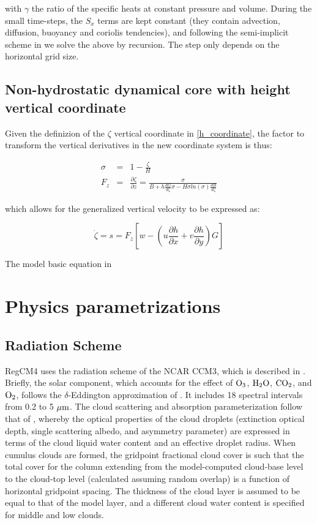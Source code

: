 with $\gamma$ the ratio of the specific heats at constant pressure and volume.
During the small time-steps, the $S_x$ terms are kept constant (they contain
advection, diffusion, buoyancy and coriolis tendencies), and following the
semi-implicit scheme in \cite{Klemp_1978} we solve the above by recursion.
The step only depends on the horizontal grid size.

\subsection{Non-hydrostatic dynamical core with height vertical coordinate}

Given the definizion of the $\zeta$ vertical coordinate in \ref{h_coordinate},
the factor to transform the vertical derivatives in the new coordinate system
is thus:

\begin{eqnarray}
\sigma &=& 1 - \frac{\zeta}{H} \\
F_z &=& \frac{\partial \zeta}{\partial z} =
  \frac{\sigma}{B + h \frac{dG}{d\zeta}\sigma - H\sigma ln(\sigma)
  \frac{dB}{d\zeta}}
\end{eqnarray}

which allows for the generalized vertical velocity to be expressed as:

\begin{equation}
\dot{\zeta} = s = F_z \left[ w - 
              \left( u \frac{\partial h}{\partial x} +
                     v \frac{\partial h}{\partial y} \right) G \right]
\end{equation}

The model basic equation in 

\section{Physics parametrizations} \label{sec:physics}

\subsection{Radiation Scheme}

\noindent RegCM4 uses the radiation scheme of
the NCAR CCM3, which is described in \cite{Kiehl_96}.  Briefly, the solar
component, which accounts for the effect of ${\rm O_3}$, ${\rm H_2O}$, ${\rm
CO_2}$, and ${\rm O_2}$, follows the $\delta$-Eddington approximation of
\cite{Kiehl_96}.  It includes 18 spectral intervals from 0.2 to 5 $\mu {\rm m}$.
The cloud scattering and absorption parameterization follow that of
\cite{Slingo_89}, whereby the optical properties of the cloud droplets
(extinction optical depth, single scattering albedo, and asymmetry parameter)
are expressed in terms of the cloud liquid water content and an effective
droplet radius.  When cumulus clouds are formed, the gridpoint fractional cloud
cover is such that the total cover for the column extending from the
model-computed cloud-base level to the cloud-top level (calculated assuming
random overlap) is a function of horizontal gridpoint spacing.  The thickness of
the cloud layer is assumed to be equal to that of the model layer, and a
different cloud water content is specified for middle and low clouds.

